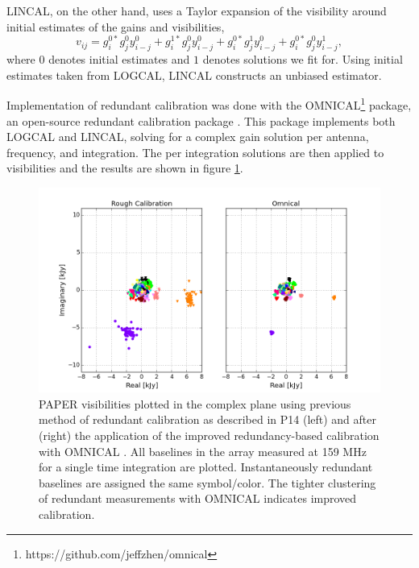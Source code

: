 \documentclass[twocolumn,numberedappendix]{emulateapj} \shorttitle{PSA64}
\begin{document}
LINCAL, on the other hand, uses a Taylor expansion of the visibility around initial
estimates of the gains and visibilities, 
\begin{equation}\label{eqn:lincal}
v_{ij} = g_{i}^{0*}g_{j}^{0}y_{i-j}^{0} + g_{i}^{1*}g_{j}^{0}y_{i-j}^{0} +
         g_{i}^{0*}g_{j}^{1}y_{i-j}^{0}+g_{i}^{0*}g_{j}^{0}y_{i-j}^{1},
\end{equation}
where $0$ denotes initial estimates and $1$ denotes 
solutions we fit for.  Using initial
estimates taken from LOGCAL, LINCAL constructs an unbiased estimator.

%    
%       

Implementation of redundant calibration was done with the 
OMNICAL\footnote{https://github.com/jeffzhen/omnical}
package, an open-source redundant calibration package
\citep{zheng_et_al2014}. This
package implements both LOGCAL and LINCAL, solving for a complex gain solution
per antenna, frequency, and integration. The per integration solutions are then
applied to visibilities and the results are shown in figure \ref{fig:omniview}.

\begin{figure}
\centering
\includegraphics[width=1.5\columnwidth]{plots/omniview_64.png}
\caption{
PAPER visibilities plotted in the complex plane using previous method of
redundant calibration as described in P14 (left) and after (right) the
application of the improved redundancy-based calibration with OMNICAL
\citep{zheng_et_al2014}.  All baselines in the array measured at 159 MHz for a
single time integration are plotted.  Instantaneously redundant baselines are
assigned the same symbol/color.  The tighter clustering of redundant
measurements with OMNICAL indicates improved calibration.
} 
\label{fig:omniview}
\end{figure}
\end{document}
